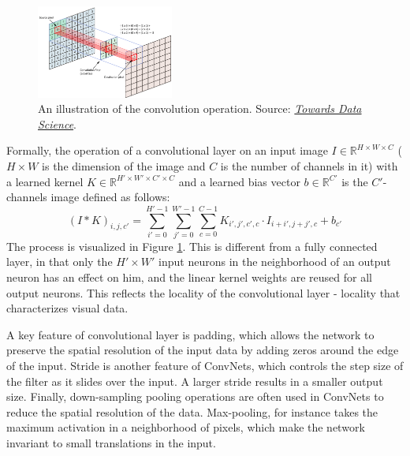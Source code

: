 \documentclass{article}
\begin{document}
\begin{figure}
    \centering
    \vspace{-2mm}
    \includegraphics[width=0.4\textwidth]{figures/convolution.png}
    \caption{
        An illustration of the convolution operation. Source: \href{https://towardsdatascience.com/applied-deep-learning-part-4-convolutional-neural-networks-584bc134c1e2}{\emph{Towards Data Science}}.
    }
    \label{fig:convolution}
    \vspace{-4mm}
\end{figure}


\medskip
\noindent
Formally, the operation of a convolutional layer on an input image $I \in \mathbb{R}^{H \times W \times C}$ ($H \times W$ is the dimension of the image and $C$ is the number of channels in it) with a learned kernel $K \in \mathbb{R}^{H' \times W' \times C' \times C}$ and a learned bias vector $b \in \mathbb{R}^{C'}$ is the $C'$-channels image defined as follows:
\begin{equation*}
    (I * K)_{i,j,c'}
        = \sum_{i' = 0}^{H'-1} \sum_{j'=0}^{W'-1} \sum_{c=0}^{C-1}
            K_{i',j',c',c} \cdot  I_{i+i',j+j',c} + b_{c'}
\end{equation*}
The process is visualized in Figure \ref{fig:convolution}. This is different from a fully connected layer, in that only the $H' \times W'$ input neurons in the neighborhood of an output neuron has an effect on him, and the linear kernel weights are reused for all output neurons. This reflects the locality of the convolutional layer - locality that characterizes visual data.

\medskip
\noindent
A key feature of convolutional layer is padding, which allows the network to preserve the spatial resolution of the input data by adding zeros around the edge of the input. Stride is another feature of ConvNets, which controls the step size of the filter as it slides over the input. A larger stride results in a smaller output size. Finally, down-sampling pooling operations are often used in ConvNets to reduce the spatial resolution of the data. Max-pooling, for instance takes the maximum activation in a neighborhood of pixels, which make the network invariant to small translations in the input.
\end{document}
